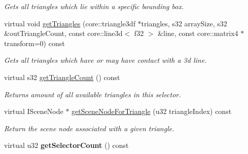 \begin{DoxyCompactItemize}
\begin{DoxyCompactList}\small\item\em Gets all triangles which lie within a specific bounding box. \end{DoxyCompactList}\item 
\hypertarget{classirr_1_1scene_1_1_c_triangle_selector_a8898113895962bb55c5eff78b83c2ae4}{virtual void \hyperlink{classirr_1_1scene_1_1_c_triangle_selector_a8898113895962bb55c5eff78b83c2ae4}{get\-Triangles} (core\-::triangle3df $\ast$triangles, s32 array\-Size, s32 \&out\-Triangle\-Count, const core\-::line3d$<$ f32 $>$ \&line, const core\-::matrix4 $\ast$transform=0) const }\label{classirr_1_1scene_1_1_c_triangle_selector_a8898113895962bb55c5eff78b83c2ae4}

\begin{DoxyCompactList}\small\item\em Gets all triangles which have or may have contact with a 3d line. \end{DoxyCompactList}\item 
\hypertarget{classirr_1_1scene_1_1_c_triangle_selector_a6f3a70eb8bcae3e2e6810f5978092cbc}{virtual s32 \hyperlink{classirr_1_1scene_1_1_c_triangle_selector_a6f3a70eb8bcae3e2e6810f5978092cbc}{get\-Triangle\-Count} () const }\label{classirr_1_1scene_1_1_c_triangle_selector_a6f3a70eb8bcae3e2e6810f5978092cbc}

\begin{DoxyCompactList}\small\item\em Returns amount of all available triangles in this selector. \end{DoxyCompactList}\item 
\hypertarget{classirr_1_1scene_1_1_c_triangle_selector_a01df72a6c8795af3eb6f2aaf9136486a}{virtual I\-Scene\-Node $\ast$ \hyperlink{classirr_1_1scene_1_1_c_triangle_selector_a01df72a6c8795af3eb6f2aaf9136486a}{get\-Scene\-Node\-For\-Triangle} (u32 triangle\-Index) const }\label{classirr_1_1scene_1_1_c_triangle_selector_a01df72a6c8795af3eb6f2aaf9136486a}

\begin{DoxyCompactList}\small\item\em Return the scene node associated with a given triangle. \end{DoxyCompactList}\item 
\hypertarget{classirr_1_1scene_1_1_c_triangle_selector_a0979b357e495957dc81186c03992664a}{virtual u32 {\bfseries get\-Selector\-Count} () const }\label{classirr_1_1scene_1_1_c_triangle_selector_a0979b357e495957dc81186c03992664a}


\end{DoxyCompactItemize}
